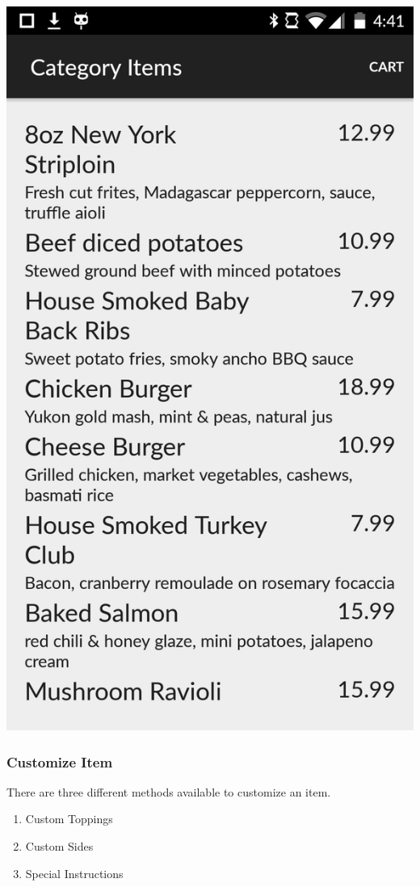 \documentclass[12pt, titlepage]{article}
\begin{document}
\begin{center}\includegraphics[scale=0.15]{items.png}\end{center}

 
\subsubsection{Customize Item}
There are three different methods available to customize an item. 

\begin{enumerate}
  \item Custom Toppings
  \item Custom Sides
  \item Special Instructions
\end{enumerate}
\end{document}
